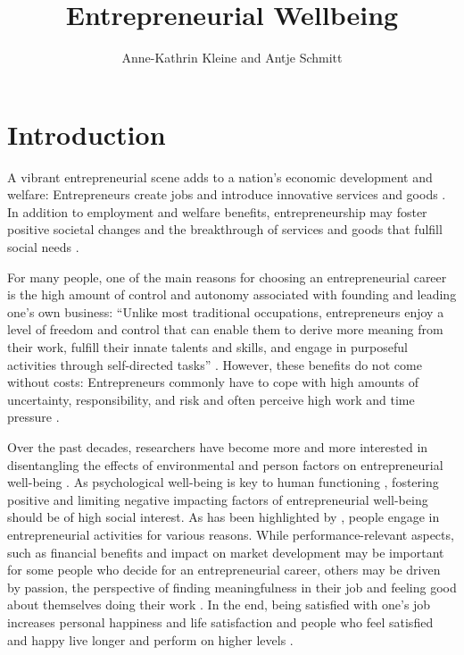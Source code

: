 \documentclass[a4paper,man,natbib]{apa6}
\title{Entrepreneurial Wellbeing}
\author{Anne-Kathrin Kleine and Antje Schmitt}
\affiliation{University of Groningen}
\begin{document}
\abstract 

\maketitle

\section{Introduction}
\label{sec:examples}
A vibrant entrepreneurial scene adds to a nation’s economic development and welfare: Entrepreneurs create jobs and introduce innovative services and goods \citep{Acs.1988, Schumpeter.1934}. In addition to employment and welfare benefits, entrepreneurship may foster positive societal changes and the breakthrough of services and goods that fulfill social needs \cite[e.g.][]{Certo2008, Stephan2018, Wiklund2019}. \par 
For many people, one of the main reasons for choosing an entrepreneurial career is the high amount of control and autonomy associated with founding and leading one's own business: “Unlike most traditional occupations, entrepreneurs enjoy a level of freedom and control that can enable them to derive more meaning from their work, fulfill their innate talents and skills, and engage in purposeful activities through self-directed tasks” \cite[p.~580] {Wiklund2019}. However, these benefits do not come without costs: Entrepreneurs commonly have to cope with high amounts of uncertainty, responsibility, and risk and often perceive high work and time pressure \citep{Stephan2018}.  \par
Over the past decades, researchers have become more and more interested in disentangling the effects of environmental and person factors on entrepreneurial well-being \cite[e.g.][]{Stephan.2018, Shir.2019, Carter2011, Baron2008}. As psychological well-being is key to human functioning \citep{Aldwin1987}, fostering positive and limiting negative impacting factors of entrepreneurial well-being should be of high social interest. As has been highlighted by \cite{Wiklund2019}, people engage in entrepreneurial activities for various reasons. While performance-relevant aspects, such as financial benefits and impact on market development may be important for some people who decide for an entrepreneurial career, others may be driven by passion, the perspective of finding meaningfulness in their job and feeling good about themselves doing their work \citep[e.g.][]{Cardon2008, Aguinis2019}. In the end, being satisfied with one's job increases personal happiness and life satisfaction \cite[e.g.][]{WEAVER1978, Unanue2017} and people who feel satisfied and happy live longer \citep{Diener2011} and perform on higher levels \citep{VanDeVoorde2012}. \par
\end{document}

